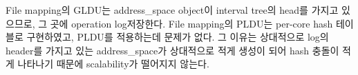 
File mapping의 GLDU는 address\_space object이 interval tree의 head를 가지고 있으므로, 그 곳에
operation log저장한다. File mapping의 PLDU는 per-core hash 테이블로 구현하였고, PLDU를 적용하는데 문제가
없다.
그 이유는 상대적으로 log의 header를 가지고 있는 address\_space가 상대적으로 적게 생성이 되어 hash 충돌이 적게 나타나기
때문에 scalability가 떨어지지 않는다.







 


